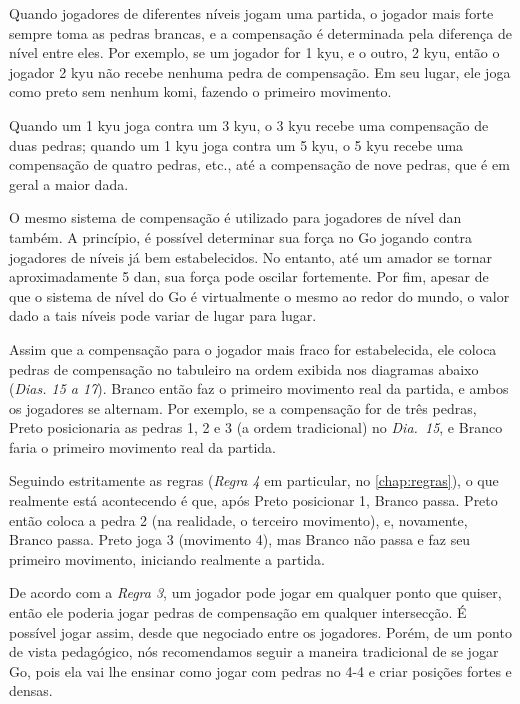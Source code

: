 Quando jogadores de diferentes níveis jogam uma partida, o jogador mais forte sempre toma as pedras brancas, e a compensação é determinada pela diferença de nível entre eles. Por exemplo, se um jogador for 1 kyu, e o outro, 2 kyu, então o jogador 2 kyu não recebe nenhuma pedra de compensação. Em seu lugar, ele joga como preto sem nenhum komi, fazendo o primeiro movimento.

Quando um 1 kyu joga contra um 3 kyu, o 3 kyu recebe uma compensação de duas pedras; quando um 1 kyu joga contra um 5 kyu, o 5 kyu recebe uma compensação de quatro pedras, etc., até a compensação de nove pedras, que é em geral a maior dada.

O mesmo sistema de compensação é utilizado para jogadores de nível dan também. A princípio, é possível determinar sua força no Go jogando contra jogadores de níveis já bem estabelecidos. No entanto, até um amador se tornar aproximadamente 5 dan, sua força pode oscilar fortemente. Por fim, apesar de que o sistema de nível do Go é virtualmente o mesmo ao redor do mundo, o valor dado a tais níveis pode variar de lugar para lugar.

Assim que a compensação para o jogador mais fraco for estabelecida, ele coloca pedras de compensação no tabuleiro na ordem exibida nos diagramas abaixo (\emph{Dias. 15 a 17}). Branco então faz o primeiro movimento real da partida, e ambos os jogadores se alternam. Por exemplo, se a compensação for de três pedras, Preto posicionaria as pedras 1, 2 e 3 (a ordem tradicional) no \emph{Dia.\@~15}, e Branco faria o primeiro movimento real da partida.

Seguindo estritamente as regras (\emph{Regra 4} em particular, no \autoref{chap:regras}), o que realmente está acontecendo é que, após Preto posicionar 1, Branco passa. Preto então coloca a pedra 2 (na realidade, o terceiro movimento), e, novamente, Branco passa. Preto joga 3 (movimento 4), mas Branco não passa e faz seu primeiro movimento, iniciando realmente a partida.

De acordo com a \emph{Regra 3}, um jogador pode jogar em qualquer ponto que quiser, então ele poderia jogar pedras de compensação em qualquer intersecção. É possível jogar assim, desde que negociado entre os jogadores. Porém, de um ponto de vista pedagógico, nós recomendamos seguir a maneira tradicional de se jogar Go, pois ela vai lhe ensinar como jogar com pedras no 4-4 e criar posições fortes e densas.
